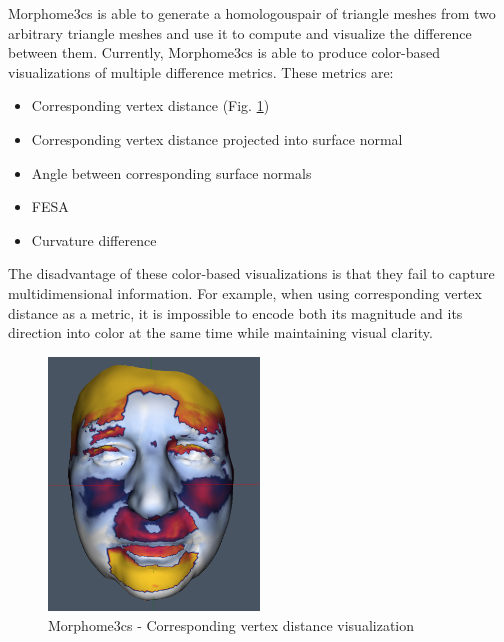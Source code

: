 Morphome3cs is able to generate a homologous\footnotemark pair of triangle meshes from two arbitrary triangle meshes and use it to compute and visualize the difference between them. Currently, Morphome3cs is able to produce color-based visualizations of multiple difference metrics. These metrics are:


\begin{itemize}
\item Corresponding vertex distance (Fig. \ref{fig:morpho_example})
\item Corresponding vertex distance projected into surface normal
\item Angle between corresponding surface normals
\item FESA\footnotemark
\item Curvature difference
\end{itemize}


The disadvantage of these color-based visualizations is that they fail to capture multidimensional information. For example, when using corresponding vertex distance as a metric, it is impossible to encode both its magnitude and its direction into color at the same time while maintaining visual clarity.

\begin{figure}[h]
\centering
\includegraphics[width=0.5\textwidth]{./img/morpho-example01.PNG}
\caption[Morphome3cs - Corresponding vertex distance visualization]{Morphome3cs - Corresponding vertex distance visualization}
\label{fig:morpho_example}
\end{figure}

